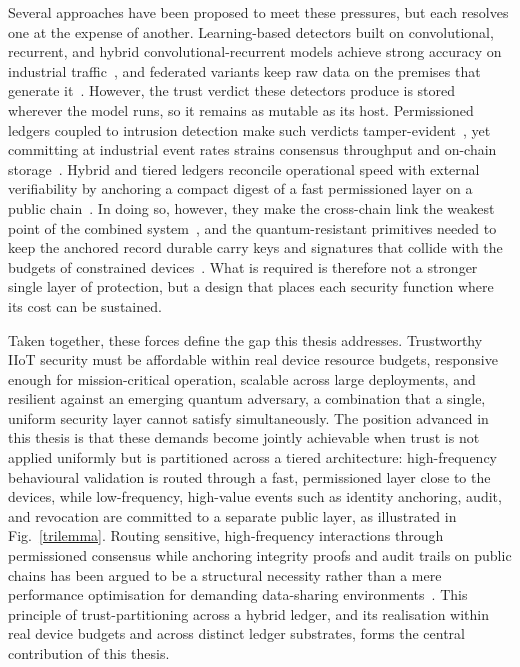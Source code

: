 Several approaches have been proposed to meet these pressures, but each resolves
one at the expense of another. Learning-based detectors built on convolutional,
recurrent, and hybrid convolutional-recurrent models achieve strong accuracy on
industrial traffic~\cite{chen2025cnnlstm, anwer2025federated}, and federated
variants keep raw data on the premises that generate
it~\cite{lee2025lightweight, mao2025fedinnid}. However, the trust verdict these
detectors produce is stored wherever the model runs, so it remains as mutable as
its host. Permissioned ledgers coupled to intrusion detection make such verdicts
tamper-evident~\cite{song2025hybrid, peng2025bctdics}, yet committing at
industrial event rates strains consensus throughput and on-chain
storage~\cite{xiong2025sharding, ding2025dcstorage}. Hybrid and tiered ledgers
reconcile operational speed with external verifiability by anchoring a compact
digest of a fast permissioned layer on a public
chain~\cite{ullah2025mbid, banitalebi2025edblsd}. In doing so, however, they make
the cross-chain link the weakest point of the combined
system~\cite{zhou2025bridgeguard}, and the quantum-resistant primitives needed
to keep the anchored record durable carry keys and signatures that collide with
the budgets of constrained devices~\cite{hanna2025comprehensive, cruz2025measuring}.
What is required is therefore not a stronger single layer of protection, but a
design that places each security function where its cost can be sustained.
 
Taken together, these forces define the gap this thesis addresses. Trustworthy
IIoT security must be affordable within real device resource budgets, responsive
enough for mission-critical operation, scalable across large deployments, and
resilient against an emerging quantum adversary, a combination that a single,
uniform security layer cannot satisfy simultaneously. The position advanced in this thesis is that these demands become jointly achievable when trust is not
applied uniformly but is partitioned across a tiered architecture:
high-frequency behavioural validation is routed through a fast, permissioned
layer close to the devices, while low-frequency, high-value events such as
identity anchoring, audit, and revocation are committed to a separate public
layer, as illustrated in Fig.~\ref{trilemma}. Routing sensitive,
high-frequency interactions through permissioned consensus while anchoring
integrity proofs and audit trails on public chains has been argued to be a
structural necessity rather than a mere performance optimisation for demanding
data-sharing environments~\cite{amadi2026security}. This principle of trust-partitioning across a hybrid
ledger, and its realisation within real device budgets and across distinct
ledger substrates, forms the central contribution of this thesis.


